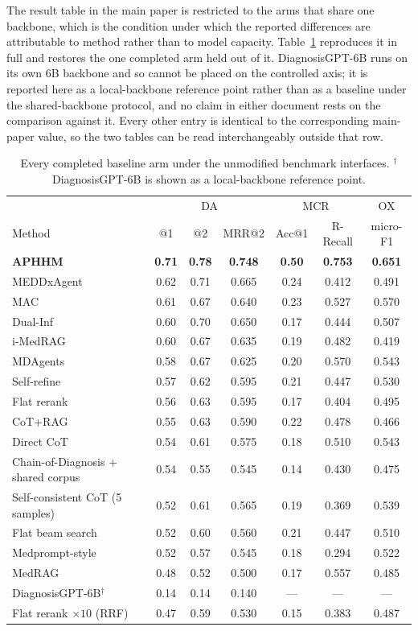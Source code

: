 \documentclass[letterpaper]{article}
\begin{document}
The result table in the main paper is restricted to the arms that share one backbone, which is the condition under which the reported differences are attributable to method rather than to model capacity.
Table~\ref{tab:all-baselines} reproduces it in full and restores the one completed arm held out of it.
DiagnosisGPT-6B runs on its own $6$B backbone and so cannot be placed on the controlled axis; it is reported here as a local-backbone reference point rather than as a baseline under the shared-backbone protocol, and no claim in either document rests on the comparison against it.
Every other entry is identical to the corresponding main-paper value, so the two tables can be read interchangeably outside that row.

\begin{table}[t]
\centering
\small
\begin{tabular}{@{}lcccccc@{}}
\toprule
& \multicolumn{3}{c}{DA} & \multicolumn{2}{c}{MCR} & OX \\
Method & @1 & @2 & MRR@2 & Acc@1 & R-Recall & micro-F1 \\
\midrule
\textbf{APHHM} & \textbf{0.71} & \textbf{0.78} & \textbf{0.748} & \textbf{0.50} & \textbf{0.753} & \textbf{0.651} \\
MEDDxAgent & 0.62 & 0.71 & 0.665 & 0.24 & 0.412 & 0.491 \\
MAC & 0.61 & 0.67 & 0.640 & 0.23 & 0.527 & 0.570 \\
Dual-Inf & 0.60 & 0.70 & 0.650 & 0.17 & 0.444 & 0.507 \\
i-MedRAG & 0.60 & 0.67 & 0.635 & 0.19 & 0.482 & 0.419 \\
MDAgents & 0.58 & 0.67 & 0.625 & 0.20 & 0.570 & 0.543 \\
Self-refine & 0.57 & 0.62 & 0.595 & 0.21 & 0.447 & 0.530 \\
Flat rerank & 0.56 & 0.63 & 0.595 & 0.17 & 0.404 & 0.495 \\
CoT+RAG & 0.55 & 0.63 & 0.590 & 0.22 & 0.478 & 0.466 \\
Direct CoT & 0.54 & 0.61 & 0.575 & 0.18 & 0.510 & 0.543 \\
Chain-of-Diagnosis + shared corpus & 0.54 & 0.55 & 0.545 & 0.14 & 0.430 & 0.475 \\
Self-consistent CoT (5 samples) & 0.52 & 0.61 & 0.565 & 0.19 & 0.369 & 0.539 \\
Flat beam search & 0.52 & 0.60 & 0.560 & 0.21 & 0.447 & 0.510 \\
Medprompt-style & 0.52 & 0.57 & 0.545 & 0.18 & 0.294 & 0.522 \\
MedRAG & 0.48 & 0.52 & 0.500 & 0.17 & 0.557 & 0.485 \\
DiagnosisGPT-6B$^{\dagger}$ & 0.14 & 0.14 & 0.140 & --- & --- & --- \\
\midrule
Flat rerank $\times 10$ (RRF) & 0.47 & 0.59 & 0.530 & 0.15 & 0.383 & 0.487 \\
\bottomrule
\end{tabular}
\caption{Every completed baseline arm under the unmodified benchmark interfaces. $^{\dagger}$DiagnosisGPT-6B is shown as a local-backbone reference point.}
\label{tab:all-baselines}
\end{table}
\end{document}

